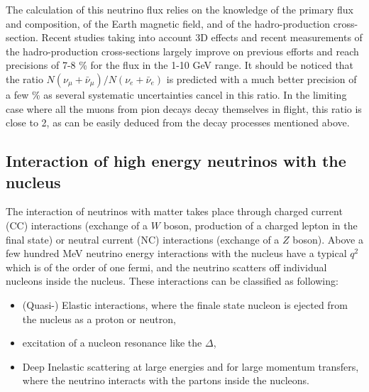 The calculation of this neutrino flux \cite{Gaisser:2002jj} relies on the knowledge of the primary flux and composition, of the Earth magnetic field, and of the hadro-production cross-section. Recent studies \cite{PhysRevD.83.123001,Barr:2004br,Battistoni:2002ew} taking into account 3D effects and recent measurements of the hadro-production cross-sections largely improve on previous efforts and reach precisions of 7-8 \% for the flux in the 1-10 GeV range. It should be noticed that the ratio $N(\nu_\mu + \bar{\nu}_\mu)/N(\nu_e + \bar{\nu}_e)$ is predicted with a much better precision of a few \% as several systematic uncertainties cancel in this ratio. In the limiting case where all the muons from pion decays decay themselves in flight, this ratio is close to 2, as can be easily deduced from the decay processes mentioned above.


\subsection{Interaction of high energy neutrinos with the nucleus}

The interaction of neutrinos with matter takes place through charged current (CC) interactions (exchange of a $W$ boson, production of a charged lepton in the final state) or neutral current (NC) interactions (exchange of a $Z$ boson). 
Above a few hundred MeV neutrino energy interactions with the nucleus have a typical $q^2$ which is of the order of one fermi, and the neutrino scatters off individual nucleons inside the nucleus. These interactions can be classified as following:
\begin{itemize}
  \item (Quasi-) Elastic interactions, where the finale state nucleon is ejected from the nucleus as a proton or neutron, 
  \item excitation of a nucleon resonance like the $\Delta$,
  \item Deep Inelastic scattering at large energies and for large momentum transfers, where the neutrino interacts with the partons inside the nucleons.
  \end{itemize}  

